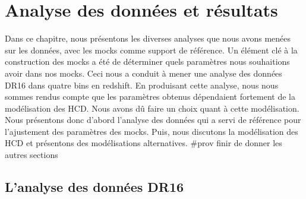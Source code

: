 \documentclass[11pt, twoside, a4paper, openright]{report}
\begin{document}

\graphicspath{ {../figures/data_ana/} }

\chapter{Analyse des données et résultats}
\minitoc
\newpage
\thispagestyle{fancy}

Dans ce chapitre, nous présentons les diverses analyses que nous avons menées sur les données, avec les mocks comme support de référence.
Un élément clé à la construction des mocks a été de déterminer quels paramètres \lya{} nous souhaitions avoir dans nos mocks.
Ceci nous a conduit à mener une analyse des données DR16 dans quatre bins en redshift.
En produisant cette analyse, nous nous sommes rendus compte que les paramètres \lya{} obtenus dépendaient fortement de la modélisation des HCD. Nous avons dû faire un choix quant à cette modélisation.
Nous présentons donc d'abord l'analyse des données qui a servi de référence pour l'ajustement des paramètres des mocks. Puis, nous discutons la modélisation des HCD et présentons des modélisations alternatives.
\#prov finir de donner les autres sections



\section{L'analyse des données DR16}
\end{document}
